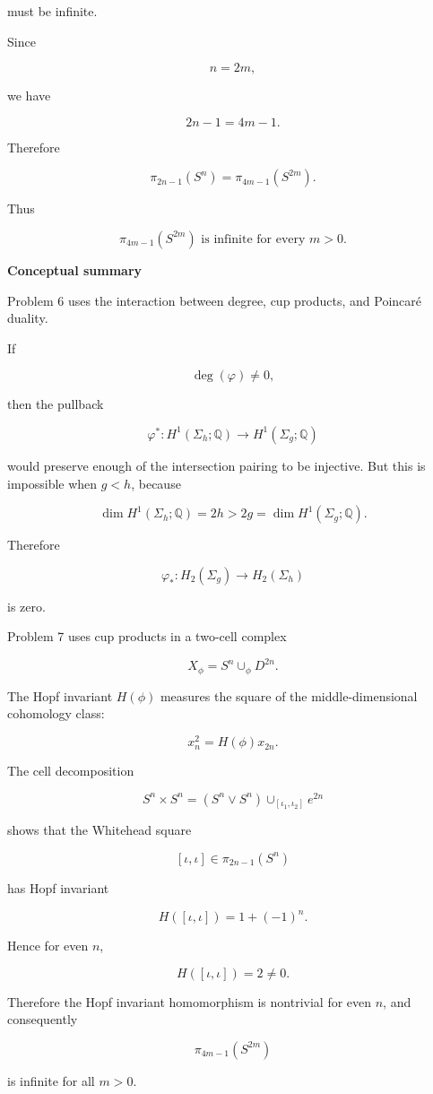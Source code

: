 \begin{solution}
must be infinite.

Since

\[
n=2m,
\]

we have

\[
2n-1=4m-1.
\]

Therefore

\[
\pi_{2n-1}(S^n)
=
\pi_{4m-1}(S^{2m}).
\]

Thus

\[
\boxed{
	\pi_{4m-1}(S^{2m})\text{ is infinite for every }m>0.
}
\]


\medskip
\noindent\textbf{Conceptual summary}\par
\smallskip


Problem 6 uses the interaction between degree, cup products, and Poincaré duality.

If

\[
\deg(\varphi)\neq 0,
\]

then the pullback

\[
\varphi^*:H^1(\Sigma_h;\mathbb Q)\to H^1(\Sigma_g;\mathbb Q)
\]

would preserve enough of the intersection pairing to be injective. But this is impossible when \(g<h\), because

\[
\dim H^1(\Sigma_h;\mathbb Q)=2h>2g=\dim H^1(\Sigma_g;\mathbb Q).
\]

Therefore

\[
\varphi_*:H_2(\Sigma_g)\to H_2(\Sigma_h)
\]

is zero.

Problem 7 uses cup products in a two-cell complex

\[
X_\phi=S^n\cup_\phi D^{2n}.
\]

The Hopf invariant \(H(\phi)\) measures the square of the middle-dimensional cohomology class:

\[
x_n^2=H(\phi)x_{2n}.
\]

The cell decomposition

\[
S^n\times S^n=(S^n\vee S^n)\cup_{[\iota_1,\iota_2]}e^{2n}
\]

shows that the Whitehead square

\[
[\iota,\iota]\in \pi_{2n-1}(S^n)
\]

has Hopf invariant

\[
H([\iota,\iota])=1+(-1)^n.
\]

Hence for even \(n\),

\[
H([\iota,\iota])=2\neq 0.
\]

Therefore the Hopf invariant homomorphism is nontrivial for even \(n\), and consequently

\[
\pi_{4m-1}(S^{2m})
\]

is infinite for all \(m>0\).
\end{solution}

